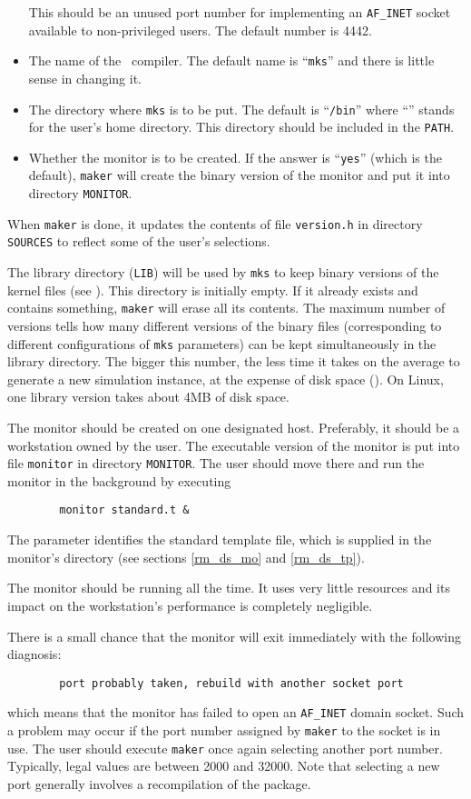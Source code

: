 \begin{itemize}
This should be an unused port number for implementing an {\tt AF\_INET}
socket available to non-privileged users.
The default number is 4442.
\item
The name of the \smurph\ compiler.
The default name is ``{\tt mks}'' and there is little sense in changing it.
\item
The directory where {\tt mks} is to be put.
The default is ``{\tt {}/bin}'' where ``{\tt {}}'' stands for the
user's home directory.
This directory should be included in the {\tt PATH}.
\item
Whether the monitor is to be created.
If the answer is ``{\tt yes}'' (which is the default), {\tt maker} will create
the binary version of the monitor and put it into directory {\tt MONITOR}.
\end{itemize}

When {\tt maker} is done, it updates the contents of file
{\tt version.h} in directory {\tt SOURCES} to reflect some of the user's
selections.

The library directory ({\tt LIB}) will be used by
{\tt mks} to keep binary versions of the kernel files (see ).
This directory is initially empty.
If it already exists and contains something, {\tt maker} will erase all its
contents.
The maximum number of versions tells how many different versions of the binary
files (corresponding to different configurations of {\tt mks} parameters)
can be kept simultaneously in the library directory.
The bigger this number, the less time it takes on the average to generate a
new simulation instance, at the expense of disk space ().
On Linux, one library version takes about 4MB of disk space.

The monitor should be created on one designated host.
Preferably, it should be a workstation owned by the user.
The executable version of the monitor is put into file {\tt monitor}
in directory {\tt MONITOR}.
The user should move there and run the monitor in the background by
executing
\begin{verbatim}
        monitor standard.t &
\end{verbatim}
The parameter identifies the standard template file, which is supplied
in the monitor's directory (see sections \ref{rm_ds_mo} and \ref{rm_ds_tp}).

The monitor should be running all the time.
It uses very little resources and its impact on the workstation's
performance is completely negligible.

There is a small
chance that the monitor will exit immediately with the following diagnosis:
\begin{verbatim}
        port probably taken, rebuild with another socket port
\end{verbatim}
which means that the monitor has failed to open an {\tt AF\_INET} domain socket.
Such a problem may occur if the port number assigned by {\tt maker} to
the socket is in use.
The user should execute {\tt maker} once again selecting another port number.
Typically, legal values are between 2000 and 32000.
Note that selecting a new port generally involves a recompilation of
the package.

